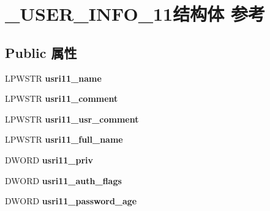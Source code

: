 \hypertarget{struct___u_s_e_r___i_n_f_o__11}{}\section{\+\_\+\+U\+S\+E\+R\+\_\+\+I\+N\+F\+O\+\_\+11结构体 参考}
\label{struct___u_s_e_r___i_n_f_o__11}
\subsection*{Public 属性}
\begin{DoxyCompactItemize}
\item 
\mbox{\label{struct___u_s_e_r___i_n_f_o__11_a3513111a4a1d7ad2120904b0e266b3dd}} 
L\+P\+W\+S\+TR {\bfseries usri11\+\_\+name}
\item 
\mbox{\label{struct___u_s_e_r___i_n_f_o__11_aad32b0dd05532ca79d4a83e1b1283678}} 
L\+P\+W\+S\+TR {\bfseries usri11\+\_\+comment}
\item 
\mbox{\label{struct___u_s_e_r___i_n_f_o__11_a5852bd81805ef589f25a78ee4e766670}} 
L\+P\+W\+S\+TR {\bfseries usri11\+\_\+usr\+\_\+comment}
\item 
\mbox{\label{struct___u_s_e_r___i_n_f_o__11_af44b5ec3e4058dc12e30dd034e76501a}} 
L\+P\+W\+S\+TR {\bfseries usri11\+\_\+full\+\_\+name}
\item 
\mbox{\label{struct___u_s_e_r___i_n_f_o__11_ae32f448ee40420c8000e35ebe4a1cebe}} 
D\+W\+O\+RD {\bfseries usri11\+\_\+priv}
\item 
\mbox{\label{struct___u_s_e_r___i_n_f_o__11_a69d106bcbd188d43b14a59cdd9e1c571}} 
D\+W\+O\+RD {\bfseries usri11\+\_\+auth\+\_\+flags}
\item 
\mbox{\label{struct___u_s_e_r___i_n_f_o__11_ad2fcb5968f6106fa2bbe5e2d16a907bc}} 
D\+W\+O\+RD {\bfseries usri11\+\_\+password\+\_\+age}
\item 
\mbox{\label{struct___u_s_e_r___i_n_f_o__11_a240103958f827593f23b908d295ad50e}} 

\end{DoxyCompactItemize}
